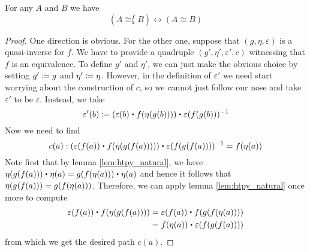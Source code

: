 \begin{thm}\label{thm:equiv-iso-adj} For any $A$ and $B$ we have
\[ (A \cong^f_a B) \leftrightarrow (A \cong B) \]
\end{thm}
\begin{proof}
One direction is obvious. For the other one, suppose that $(g,\eta,\varepsilon)$ is a quasi-inverse for $f$. We have to provide
a quadruple $(g',\eta',\varepsilon',c)$ witnessing that $f$ is an equivalence. To
define $g'$ and $\eta'$, we can just make the obvious choice by setting $g'
\coloneqq g$ and $\eta'\coloneqq \eta$. However, in the definition of $\varepsilon'$ we
need start worrying about the construction of $c$, so we cannot just follow our nose
and take $\varepsilon'$ to be $\varepsilon$. Instead, we take
\begin{equation*}
\varepsilon'(b) \defeq (\varepsilon(b)\ct \ap{f}{\eta(g(b))})\ct \varepsilon(f(g(b)))^{-1}
\end{equation*}
Now we need to find
\begin{equation*}
c(a):(\varepsilon(f(a))\ct \ap{f}{\eta(g(f(a)))})\ct \varepsilon(f(g(f(a))))^{-1}=\ap{f}{\eta(a)}
\end{equation*}
Note first that by lemma \ref{lem:htpy_natural}, we have 
$\eta(g(f(a)))\ct\eta(a)=\ap{g}{\ap{f}{\eta(a)}}\ct\eta(a)$ and hence it follows
that $\eta(g(f(a)))={g}\!\left({{f}\!\left({\eta(a)}\right)}\right)$. Therefore, we can apply lemma
\ref{lem:htpy_natural} once more to compute
\begin{align*}
\varepsilon(f(a))\ct \ap{f}{\eta(g(f(a)))}
& = \varepsilon(f(a))\ct \ap{f}{\ap{g}{\ap{f}{\eta(a)}}}\\
& = \ap{f}{\eta(a)}\ct\varepsilon(f(g(f(a))))
\end{align*}
from which we get the desired path $c(a)$.
\end{proof}



